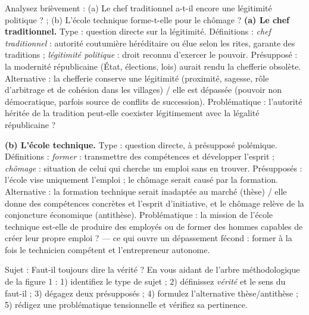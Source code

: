 \documentclass[11pt]{article}
\begin{document}
\begin{exoresolu}
Analysez brièvement : (a) \og Le chef traditionnel a-t-il encore une légitimité politique ? \fg{} ; (b) \og L'école technique forme-t-elle pour le chômage ? \fg{}
\tcblower
\textbf{(a) Le chef traditionnel.} Type : question directe sur la légitimité. Définitions : \emph{chef traditionnel} : autorité coutumière héréditaire ou élue selon les rites, garante des traditions ; \emph{légitimité politique} : droit reconnu d'exercer le pouvoir. Présupposé : la modernité républicaine (État, élections, lois) aurait rendu la chefferie obsolète. Alternative : la chefferie conserve une légitimité (proximité, sagesse, rôle d'arbitrage et de cohésion dans les villages) / elle est dépassée (pouvoir non démocratique, parfois source de conflits de succession). Problématique : \og l'autorité héritée de la tradition peut-elle coexister légitimement avec la légalité républicaine ? \fg{}

\textbf{(b) L'école technique.} Type : question directe, à présupposé polémique. Définitions : \emph{former} : transmettre des compétences et développer l'esprit ; \emph{chômage} : situation de celui qui cherche un emploi sans en trouver. Présupposés : l'école vise uniquement l'emploi ; le chômage serait causé par la formation. Alternative : la formation technique serait inadaptée au marché (thèse) / elle donne des compétences concrètes et l'esprit d'initiative, et le chômage relève de la conjoncture économique (antithèse). Problématique : \og la mission de l'école technique est-elle de produire des employés ou de former des hommes capables de créer leur propre emploi ? \fg{} — ce qui ouvre un dépassement fécond : former à la fois le technicien compétent et l'entrepreneur autonome.
\end{exoresolu}

\begin{exercice}
Sujet : \og Faut-il toujours dire la vérité ? \fg{} En vous aidant de l'arbre méthodologique de la figure 1 : 1) identifiez le type de sujet ; 2) définissez \emph{vérité} et le sens du \og faut-il \fg{} ; 3) dégagez deux présupposés ; 4) formulez l'alternative thèse/antithèse ; 5) rédigez une problématique tensionnelle et vérifiez sa pertinence.
\end{exercice}
\end{document}
